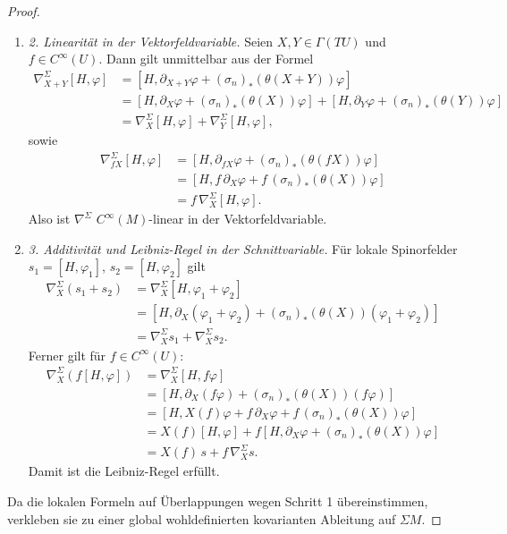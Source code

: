 \documentclass[10pt, letterpaper]{article}
\begin{document}
\begin{proof}
\begin{enumerate}
    \item \emph{2. Linearität in der Vektorfeldvariable.}
    Seien \(X,Y\in \Gamma(TU)\) und \(f\in C^\infty(U)\). Dann gilt unmittelbar aus der Formel
    \begin{align*}
    \nabla^\Sigma_{X+Y}[H,\varphi]
    &=
    \left[H,\partial_{X+Y}\varphi+(\sigma_n)_*(\theta(X+Y))\varphi\right] \\
    &=
    \left[H,\partial_X\varphi+(\sigma_n)_*(\theta(X))\varphi\right]
    +
    \left[H,\partial_Y\varphi+(\sigma_n)_*(\theta(Y))\varphi\right] \\
    &=
    \nabla^\Sigma_X[H,\varphi]+\nabla^\Sigma_Y[H,\varphi],
    \end{align*}
    sowie
    \begin{align*}
    \nabla^\Sigma_{fX}[H,\varphi]
    &=
    \left[H,\partial_{fX}\varphi+(\sigma_n)_*(\theta(fX))\varphi\right] \\
    &=
    \left[H,f\,\partial_X\varphi+f\,(\sigma_n)_*(\theta(X))\varphi\right] \\
    &=
    f\,\nabla^\Sigma_X[H,\varphi].
    \end{align*}
    Also ist \(\nabla^\Sigma\) \(C^\infty(M)\)-linear in der Vektorfeldvariable.

    \medskip

    \item \emph{3. Additivität und Leibniz-Regel in der Schnittvariable.}
    Für lokale Spinorfelder \(s_1=[H,\varphi_1]\), \(s_2=[H,\varphi_2]\) gilt
    \begin{align*}
    \nabla^\Sigma_X(s_1+s_2)
    &=
    \nabla^\Sigma_X[H,\varphi_1+\varphi_2] \\
    &=
    \left[H,\partial_X(\varphi_1+\varphi_2)+(\sigma_n)_*(\theta(X))(\varphi_1+\varphi_2)\right] \\
    &=
    \nabla^\Sigma_X s_1+\nabla^\Sigma_X s_2.
    \end{align*}
    Ferner gilt für \(f\in C^\infty(U)\):
    \begin{align*}
    \nabla^\Sigma_X(f[H,\varphi])
    &=
    \nabla^\Sigma_X[H,f\varphi] \\
    &=
    \left[H,\partial_X(f\varphi)+(\sigma_n)_*(\theta(X))(f\varphi)\right] \\
    &=
    \left[H,X(f)\varphi+f\,\partial_X\varphi+f\,(\sigma_n)_*(\theta(X))\varphi\right] \\
    &=
    X(f)[H,\varphi]+f\left[H,\partial_X\varphi+(\sigma_n)_*(\theta(X))\varphi\right] \\
    &=
    X(f)\,s+f\,\nabla^\Sigma_X s.
    \end{align*}
    Damit ist die Leibniz-Regel erfüllt.
\end{enumerate}


Da die lokalen Formeln auf Überlappungen wegen Schritt 1 übereinstimmen, verkleben sie zu einer global wohldefinierten kovarianten Ableitung auf \(\Sigma M\).
\end{proof}
\end{document}
